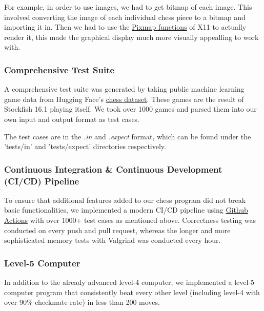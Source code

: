 \documentclass[12pt]{article}
\begin{document}
For example, in order to use images, we had to get
bitmap of each image. This involved
converting the image of each individual chess piece
to a bitmap and importing it in. Then
we had to use the \underline{Pixmap functions}
of X11 to actually render it, this made the 
graphical display much more visually appealling to work with.

\subsubsection*{Comprehensive Test Suite}

A comprehensive test suite was generated by taking public
machine learning game data from Hugging Face's \href{https://huggingface.co/datasets/laion/strategic_game_chess?row=0}{\underline{chess dataset}}. These games are the result of Stockfish 16.1 playing itself. We took over 1000 games and parsed them into our own input and output format as test cases.

\bigskip

The test cases are in the \textit{.in} and \textit{.expect} format, which can be found under the 'tests/in' and 'tests/expect' directories respectively. 

\subsubsection*{Continuous Integration \& Continuous Development (CI/CD) Pipeline}
To ensure that additional features added to our chess program did not break basic functionalities, we implemented a modern CI/CD pipeline using \href{https://github.com/PeteMango/CS247-Chess/actions}{\underline{Github Actions}} with over 1000+ test cases as mentioned above. Correctness testing was conducted on every push and pull request, whereas the longer and more sophisticated memory tests with Valgrind was conducted every hour.

\subsubsection*{Level-5 Computer}

In addition to the already advanced level-4 computer, we implemented a level-5 computer program that consistently beat every other level (including level-4 with over 90\% checkmate rate) in less than 200 moves.

\bigskip
\end{document}
